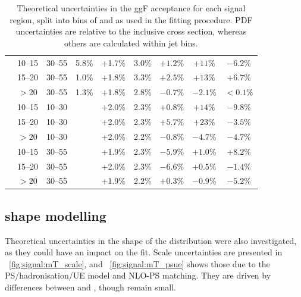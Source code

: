 \begin{table}
\begin{tabular}{ccc|cccccc}
		& 10--15 & 30--55 & 5.8\% & +1.7\% & 3.0\% & $+1.2\%$ & $+11\%$  & $-6.2\%$ \\
		& 15--20 & 30--55 & 1.0\% & +1.8\% & 3.3\% & $+2.5\%$ & $+13\%$  & $+6.7\%$  \\
		&  $>20$ & 30--55 & 1.3\% & +1.8\% & 2.8\% & $-0.7\%$ & $-2.1\%$ & $<0.1\%$ \\
		\hline
		\multirow{6}{*}{\twojet}
	    & 10--15 & 10--30 &       & +2.0\% & 2.3\% & $+0.8\%$ & $+14\%$  & $-9.8\%$ \\
		& 15--20 & 10--30 &       & +2.0\% & 2.3\% & $+5.7\%$ & $+23\%$  & $-3.5\%$  \\
		&  $>20$ & 10--30 &       & +2.0\% & 2.2\% & $-0.8\%$ & $-4.7\%$ & $-4.7\%$ \\
		& 10--15 & 30--55 &       & +1.9\% & 2.3\% & $-5.9\%$ & $+1.0\%$ & $+8.2\%$ \\
		& 15--20 & 30--55 &       & +2.0\% & 2.3\% & $-6.6\%$ & $+0.5\%$ & $-1.4\%$ \\
		&  $>20$ & 30--55 &       & +1.9\% & 2.2\% & $+0.3\%$ & $-0.9\%$ & $-5.2\%$ \\
	\end{tabular}
	\caption{Theoretical uncertainties in the ggF acceptance for each signal region, 
	split into bins of \ptsubleadlep and \mll as used in the fitting procedure. PDF 
	uncertainties are relative to the inclusive cross section, whereas others are 
	calculated within jet bins.}
	\label{tab:signal:acc_unc_binned}
\end{table}



\subsection{\mt shape modelling}

Theoretical uncertainties in the shape of the \mt distribution were also investigated, 
as they could have an impact on the fit. Scale uncertainties are presented in 
\Figure~\ref{fig:signal:mT_scale}, and \Figure~\ref{fig:signal:mT_psue} shows those due 
to the PS/hadronisation/UE model and NLO-PS matching. They are driven by differences 
between  and \fherwig, though remain small.

